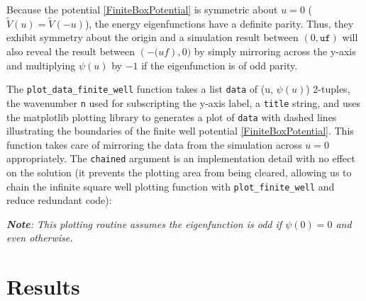 \documentclass{article}
\begin{document}
Because the potential \eqref{FiniteBoxPotential} is symmetric about $u=0$
($\widetilde{V}(u) = \widetilde{V}(-u)$), the energy eigenfunctions have a
definite parity. Thus, they exhibit symmetry about the origin and a simulation
result between $(0, \texttt{uf})$ will also reveal the result between
$(-\texttt(uf), 0)$ by simply mirroring across the y-axis and multiplying
$\psi(u)$ by $-1$ if the eigenfunction is of odd parity.

The \texttt{plot\_data\_finite\_well} function takes a list \texttt{data} of
(u, $\psi(u)$) 2-tuples, the wavenumber \texttt{n} used for subscripting the
y-axis label, a \texttt{title} string, and uses the matplotlib plotting library
to generates a plot of \texttt{data} with dashed lines illustrating the
boundaries of the finite well potential \eqref{FiniteBoxPotential}. This
function takes care of mirroring the data from the simulation across $u=0$
appropriately. The \texttt{chained} argument is an implementation detail with
no effect on the solution (it prevents the plotting area from being cleared,
allowing us to chain the infinite square well plotting function with
\texttt{plot\_finite\_well} and reduce redundant code):

\emph{\textbf{Note}: This plotting routine assumes the eigenfunction is odd if
$\psi(0)=0$ and even otherwise.}


\section{Results}
\end{document}
